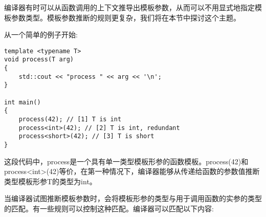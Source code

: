 编译器有时可以从函数调用的上下文推导出模板参数，从而可以不用显式地指定模板参数类型。模板参数推断的规则更复杂，我们将在本节中探讨这个主题。

从一个简单的例子开始:

\begin{lstlisting}[style=styleCXX]
template <typename T>
void process(T arg)
{
	std::cout << "process " << arg << '\n';
}

int main()
{
	process(42); // [1] T is int
	process<int>(42); // [2] T is int, redundant
	process<short>(42); // [3] T is short
}
\end{lstlisting}

这段代码中，process是一个具有单一类型模板形参的函数模板。process(42)和process<int>(42)等价，在第一种情况下，编译器能够从传递给函数的参数值推断类型模板形参T的类型为int。

当编译器试图推断模板参数时，会将模板形参的类型与用于调用函数的实参的类型的匹配。有一些规则可以控制这种匹配。编译器可以匹配以下内容:

